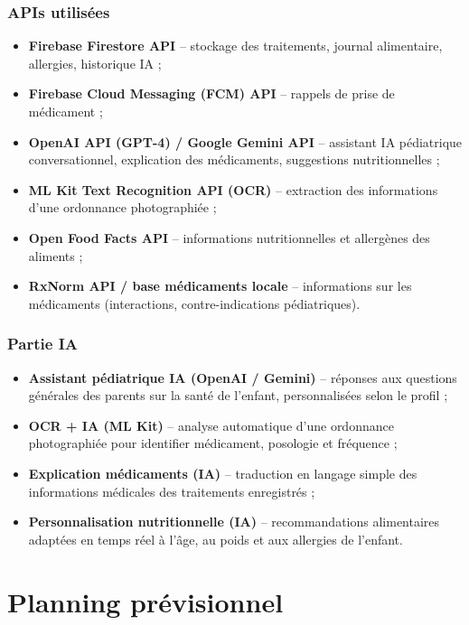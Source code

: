 \documentclass[11pt,a4paper]{article}
\begin{document}
\subsubsection*{APIs utilisées}
\begin{itemize}
  \item \textbf{Firebase Firestore API} -- stockage des traitements, journal alimentaire, allergies, historique IA ;
  \item \textbf{Firebase Cloud Messaging (FCM) API} -- rappels de prise de médicament ;
  \item \textbf{OpenAI API (GPT-4) / Google Gemini API} -- assistant IA pédiatrique conversationnel, explication des médicaments, suggestions nutritionnelles ;
  \item \textbf{ML Kit Text Recognition API (OCR)} -- extraction des informations d'une ordonnance photographiée ;
  \item \textbf{Open Food Facts API} -- informations nutritionnelles et allergènes des aliments ;
  \item \textbf{RxNorm API / base médicaments locale} -- informations sur les médicaments (interactions, contre-indications pédiatriques).
\end{itemize}

\subsubsection*{Partie IA}
\begin{itemize}
  \item \textbf{Assistant pédiatrique IA (OpenAI / Gemini)} -- réponses aux questions générales des parents sur la santé de l'enfant, personnalisées selon le profil ;
  \item \textbf{OCR + IA (ML Kit)} -- analyse automatique d'une ordonnance photographiée pour identifier médicament, posologie et fréquence ;
  \item \textbf{Explication médicaments (IA)} -- traduction en langage simple des informations médicales des traitements enregistrés ;
  \item \textbf{Personnalisation nutritionnelle (IA)} -- recommandations alimentaires adaptées en temps réel à l'âge, au poids et aux allergies de l'enfant.
\end{itemize}

\section{Planning prévisionnel}
\end{document}
